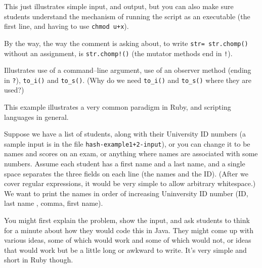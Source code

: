 \documentclass[12pt]{article}
\begin{document}
      \begin{description}

        \addtolength{\itemsep}{1mm}

        \item[\texttt{simple-input.rb}:] This just illustrates simple input,
              and output, but you can also make sure students understand the
              mechanism of running the script as an executable (the first
              line, and having to use \texttt{chmod u+x}).

              By the way, the way the comment is asking about, to write
              \texttt{str= str.chomp()} without an assignment, is
              \texttt{str.chomp!()} (the mutator methods end in \texttt{!}).

        \item[\texttt{fib.rb}:] Illustrates use of a command--line argument,
              use of an observer method (ending in \texttt{?}),
              \texttt{to\_i()} and \texttt{to\_s()}.  (Why do we need
              \texttt{to\_i()} and \texttt{to\_s()} where they are used?)

        \item[\texttt{hash-example1.rb}:] This example illustrates a very
              common paradigm in Ruby, and scripting languages in general.

              Suppose we have a list of students, along with their
              University ID numbers (a sample input is in the file
              \texttt{hash-example1+2-input}), or you can change it to be
              names and scores on an exam, or anything where names are
              associated with some numbers.  Assume each student has a first
              name and a last name, and a single space separates the three
              fields on each line (the names and the ID).  (After we cover
              regular expressions, it would be very simple to allow
              arbitrary whitespace.)  We want to print the names in order of
              increasing Uninversity ID number (ID, last name , comma, first
              name).

              You might first explain the problem, show the input, and ask
              students to think for a minute about how they would code this
              in Java.  They might come up with various ideas, some of which
              would work and some of which would not, or ideas that would
              work but be a little long or awkward to write.  It's very
              simple and short in Ruby though.


\end{description}
\end{document}
